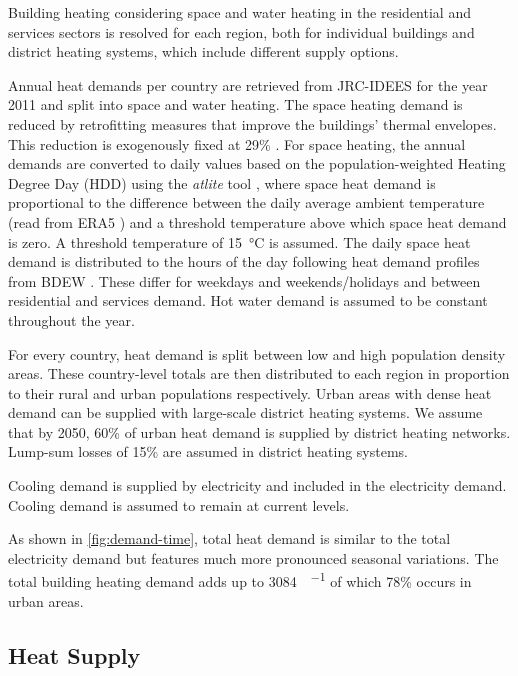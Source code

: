 Building heating considering space and water heating in the residential and
services sectors is resolved for each region, both for individual buildings and
district heating systems, which include different supply options.

Annual heat demands per country are retrieved from JRC-IDEES  for
the year 2011 and split into space and water heating. The space heating demand
is reduced by retrofitting measures that improve the buildings' thermal
envelopes. This reduction is exogenously fixed at 29\%
. For space
heating, the annual demands are converted to daily values based on the
population-weighted Heating Degree Day (HDD) using the \textit{atlite} tool
\citeS{}, where space heat demand is proportional to the difference between the
daily average ambient temperature (read from ERA5 \citeS{}) and a threshold
temperature above which space heat demand is zero. A threshold temperature of
\SI{15}{\celsius} is assumed. The daily space heat demand is distributed to the
hours of the day following heat demand profiles from BDEW \citeS{}. These differ
for weekdays and weekends/holidays and between residential and services demand.
Hot water demand is assumed to be constant throughout the year.

For every country, heat demand is split between low and high population density
areas. These country-level totals are then distributed to each region in
proportion to their rural and urban populations respectively. Urban areas with
dense heat demand can be supplied with large-scale district heating systems. We
assume that by 2050, 60\% of urban heat demand is supplied by district heating
networks. Lump-sum losses of 15\% are assumed in district heating systems.

Cooling demand is supplied by electricity and included in the electricity
demand. Cooling demand is assumed to remain at current levels.

As shown in \cref{fig:demand-time}, total heat demand is similar to the total
electricity demand but features much more pronounced seasonal variations. The
total building heating demand adds up to \SI{3084}{\twh\per\year} of which 78\%
occurs in urban areas.


\subsection{Heat Supply}
\label{sec:si:heat:supply}


